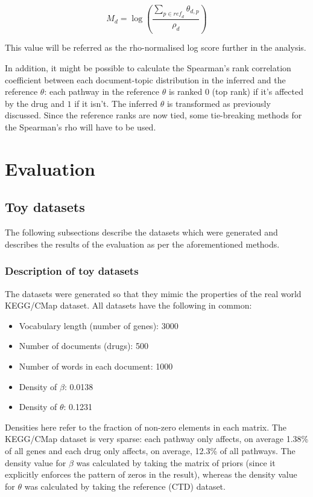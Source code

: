 \documentclass[12pt,a4paper,twoside,openright]{report}
\begin{document}
\begin{equation}\label{eq:rho-normalised-score}
M_d = \log\left(\frac{\sum\limits_{p \in \mathit{ref}_d}{\theta_{d, p}}}{\rho_d}\right)
\end{equation}

This value will be referred as the rho-normalised log score further in the analysis.

In addition, it might be possible to calculate the Spearman's rank correlation coefficient between each document-topic distribution in the inferred and the reference $\theta$: each pathway in the reference $\theta$ is ranked $0$ (top rank) if it's affected by the drug and $1$ if it isn't. The inferred $\theta$ is transformed as previously discussed. Since the reference ranks are now tied, some tie-breaking methods for the Spearman's rho will have to be used.

\chapter{Evaluation}

\section{Toy datasets}

The following subsections describe the datasets which were generated and describes the results of the evaluation as per the aforementioned methods.

\subsection{Description of toy datasets}

The datasets were generated so that they mimic the properties of the real world KEGG/CMap dataset. All datasets have the following in common:

\begin{itemize}[noitemsep]
\item Vocabulary length (number of genes): 3000
\item Number of documents (drugs): 500
\item Number of words in each document: 1000
\item Density of $\beta$: 0.0138
\item Density of $\theta$: 0.1231
\end{itemize}

Densities here refer to the fraction of non-zero elements in each matrix. The KEGG/CMap dataset is very sparse: each pathway only affects, on average 1.38\% of all genes and each drug only affects, on average, 12.3\% of all pathways. The density value for $\beta$ was calculated by taking the matrix of priors (since it explicitly enforces the pattern of zeros in the result), whereas the density value for $\theta$ was calculated by taking the reference (CTD) dataset.
\end{document}
